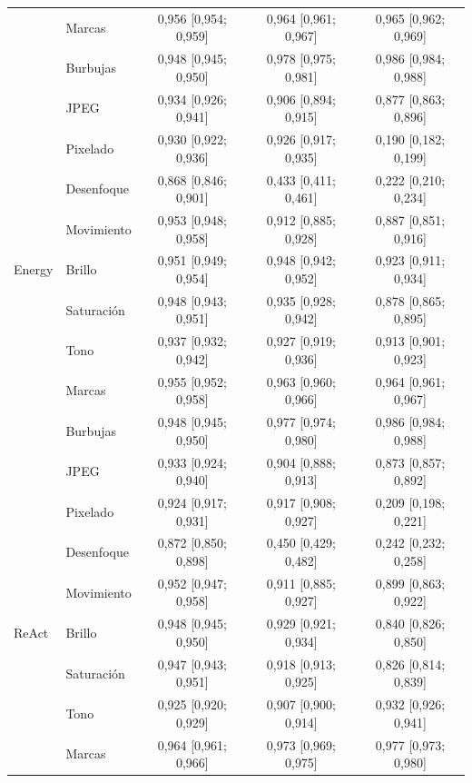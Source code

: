 {\begin{longtable}{llccc}
 & Marcas & 0{,}956 [0{,}954; 0{,}959] & 0{,}964 [0{,}961; 0{,}967] & 0{,}965 [0{,}962; 0{,}969] \\
 & Burbujas & 0{,}948 [0{,}945; 0{,}950] & 0{,}978 [0{,}975; 0{,}981] & 0{,}986 [0{,}984; 0{,}988] \\
 & JPEG & 0{,}934 [0{,}926; 0{,}941] & 0{,}906 [0{,}894; 0{,}915] & 0{,}877 [0{,}863; 0{,}896] \\
 & Pixelado & 0{,}930 [0{,}922; 0{,}936] & 0{,}926 [0{,}917; 0{,}935] & 0{,}190 [0{,}182; 0{,}199] \\
 & Desenfoque & 0{,}868 [0{,}846; 0{,}901] & 0{,}433 [0{,}411; 0{,}461] & 0{,}222 [0{,}210; 0{,}234] \\
 & Movimiento & 0{,}953 [0{,}948; 0{,}958] & 0{,}912 [0{,}885; 0{,}928] & 0{,}887 [0{,}851; 0{,}916] \\
\midrule
Energy & Brillo & 0{,}951 [0{,}949; 0{,}954] & 0{,}948 [0{,}942; 0{,}952] & 0{,}923 [0{,}911; 0{,}934] \\
 & Saturación & 0{,}948 [0{,}943; 0{,}951] & 0{,}935 [0{,}928; 0{,}942] & 0{,}878 [0{,}865; 0{,}895] \\
 & Tono & 0{,}937 [0{,}932; 0{,}942] & 0{,}927 [0{,}919; 0{,}936] & 0{,}913 [0{,}901; 0{,}923] \\
 & Marcas & 0{,}955 [0{,}952; 0{,}958] & 0{,}963 [0{,}960; 0{,}966] & 0{,}964 [0{,}961; 0{,}967] \\
 & Burbujas & 0{,}948 [0{,}945; 0{,}950] & 0{,}977 [0{,}974; 0{,}980] & 0{,}986 [0{,}984; 0{,}988] \\
 & JPEG & 0{,}933 [0{,}924; 0{,}940] & 0{,}904 [0{,}888; 0{,}913] & 0{,}873 [0{,}857; 0{,}892] \\
 & Pixelado & 0{,}924 [0{,}917; 0{,}931] & 0{,}917 [0{,}908; 0{,}927] & 0{,}209 [0{,}198; 0{,}221] \\
 & Desenfoque & 0{,}872 [0{,}850; 0{,}898] & 0{,}450 [0{,}429; 0{,}482] & 0{,}242 [0{,}232; 0{,}258] \\
 & Movimiento & 0{,}952 [0{,}947; 0{,}958] & 0{,}911 [0{,}885; 0{,}927] & 0{,}899 [0{,}863; 0{,}922] \\
\midrule
ReAct & Brillo & 0{,}948 [0{,}945; 0{,}950] & 0{,}929 [0{,}921; 0{,}934] & 0{,}840 [0{,}826; 0{,}850] \\
 & Saturación & 0{,}947 [0{,}943; 0{,}951] & 0{,}918 [0{,}913; 0{,}925] & 0{,}826 [0{,}814; 0{,}839] \\
 & Tono & 0{,}925 [0{,}920; 0{,}929] & 0{,}907 [0{,}900; 0{,}914] & 0{,}932 [0{,}926; 0{,}941] \\
 & Marcas & 0{,}964 [0{,}961; 0{,}966] & 0{,}973 [0{,}969; 0{,}975] & 0{,}977 [0{,}973; 0{,}980] \\

\end{longtable}}
